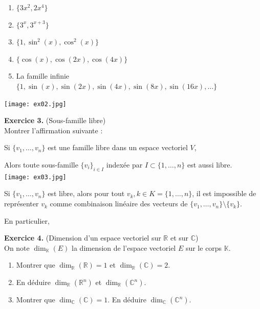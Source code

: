 \documentclass[a4paper, 10pt]{report}
\begin{document}
	\begin{enumerate}[label=\arabic*.]
		\item $\{3x^2, 2x^4\}$
		\item $\{3^x, 3^{x+3}\}$
		\item $\{1, \sin^2(x), \cos^2(x)\}$
		\item $\{\cos(x), \cos(2x), \cos(4x)\}$
		\item La famille infinie $\{1, \sin(x), \sin(2x), \sin(4x),
			\sin(8x), \sin(16x), \dotsc\}$
	\end{enumerate}
	
	\texttt{[image: ex02.jpg]}
	
	\newpage
	
	\noindent
	\textbf{Exercice 3.} (Sous-famille libre)\\
	Montrer l'affirmation suivante :
	
	Si $\{v_1, \dotsc, v_n\}$ est une famille libre dans un espace
	vectoriel $V$,
	
	Alors toute sous-famille $\{v_i\}_{i \in I}$ indexée par 
	$I \subset \{1, \dotsc, n\}$ est aussi libre.\\
	
	\texttt{[image: ex03.jpg]}
	
	\colorbox{solution}
	{
		\begin{minipage}{0.9\textwidth}
			Si $\{v_1, \dotsc, v_n\}$ est libre, alors pour tout
			$v_k, k \in K = \{1, \dotsc, n\}$, il est impossible de
			représenter $v_k$ comme combinaison linéaire des vecteurs
			de $\{v_1, \dotsc, v_n\} \setminus \{v_k\}$.
			
			En particulier, 
		\end{minipage}
	}
	
	\vspace{5mm}
	\noindent
	\textbf{Exercice 4.} (Dimension d'un espace vectoriel sur
	$\mathbb{R}$ et sur $\mathbb{C}$)\\
	On note $\dim_{\mathbb{K}}(E)$ la dimension de l'espace vectoriel
	$E$ sur le corps $\mathbb{K}$.
	
	\begin{enumerate}[label=(\alph*)]
		\item Montrer que $\dim_{\mathbb{R}}(\mathbb{R}) = 1$ et
		$\dim_{\mathbb{R}}(\mathbb{C}) = 2$.
		\item En déduire $\dim_{\mathbb{R}}(\mathbb{R}^n)$ et
		$\dim_{\mathbb{R}}(\mathbb{C}^n)$.
		\item Montrer que $\dim_{\mathbb{C}}(\mathbb{C}) = 1$.
		En déduire $\dim_{\mathbb{C}}(\mathbb{C}^n)$.
	\end{enumerate}
	
\end{document}
